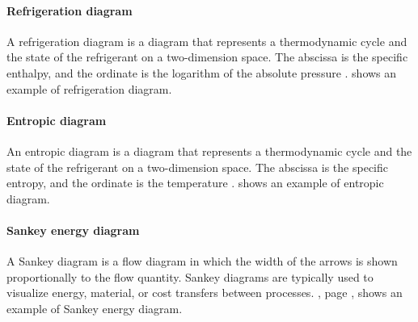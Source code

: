 \paragraph{Refrigeration diagram}

A refrigeration diagram is a diagram that represents a thermodynamic
cycle and the state of the refrigerant on a two-dimension space. The
abscissa is the specific enthalpy, and the ordinate is the logarithm of
the absolute pressure
\citep[p.\,370--373]{Borel-Favrat-2010a}. 
shows an example of refrigeration diagram.

\paragraph{Entropic diagram}

An entropic diagram is a diagram that represents a thermodynamic cycle
and the state of the refrigerant on a two-dimension space. The
abscissa is the specific entropy, and the ordinate is the temperature
\citep[p.\,355--361]{Borel-Favrat-2010a}. 
shows an example of entropic diagram.

\paragraph{Sankey energy diagram}

A Sankey diagram is a flow diagram in which the width of the arrows is
shown proportionally to the flow quantity. Sankey diagrams are
typically used to visualize energy, material, or cost transfers
between processes. , page
\pageref{fig:awp-A-7.0/W35.6-sankey-energy}, shows an example of
Sankey energy diagram.

\FloatBarrier


\label{sec:methodo-refs}
